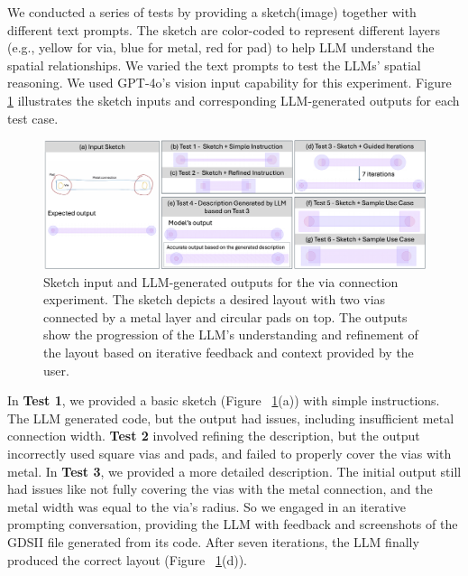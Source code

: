 \documentclass{article}
\begin{document}
We conducted a series of tests by providing a sketch(image) together with different text prompts. The sketch are color-coded to represent different layers (e.g., yellow for via, blue for metal, red for pad) to help LLM understand the spatial relationships. We varied the text prompts to test the LLMs' spatial reasoning. We used GPT-4o's vision input capability for this experiment. Figure \ref{fig:via_experiment} illustrates the sketch inputs and corresponding LLM-generated outputs for each test case.

\begin{figure}[!h]
\centering
\includegraphics[width=1\linewidth]{Figure1_v5.png}
\caption{Sketch input and LLM-generated outputs for the via connection experiment. The sketch depicts a desired layout with two vias connected by a metal layer and circular pads on top. The outputs show the progression of the LLM's understanding and refinement of the layout based on iterative feedback and context provided by the user.}
\label{fig:via_experiment}
\end{figure}
In \textbf{Test 1}, we provided a basic sketch (Figure ~\ref{fig:via_experiment}(a)) with simple instructions. The LLM generated code, but the output had issues, including insufficient metal connection width. \textbf{Test 2} involved refining the description, but the output incorrectly used square vias and pads, and failed to properly cover the vias with metal. In \textbf{Test 3}, we provided a more detailed description. The initial output still had issues like not fully covering the vias with the metal connection, and the metal width was equal to the via's radius. So we engaged in an iterative prompting conversation, providing the LLM with feedback and screenshots of the GDSII file generated from its code. After seven iterations, the LLM finally produced the correct layout (Figure ~\ref{fig:via_experiment}(d)).
\end{document}
